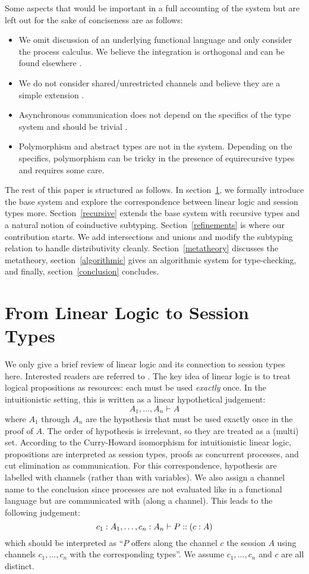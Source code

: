 \documentclass[a4paper,USenglish]{lipics-v2016}
\begin{document}
Some aspects that would be important in a full accounting of the system but are left out for the sake of conciseness are as follows:
\begin{itemize}
  \item We omit discussion of an underlying functional language and only consider the process calculus. We believe the integration is orthogonal and can be found elsewhere \cite{ToninhoCP13}.
  \item We do not consider shared/unrestricted channels and believe they are a simple extension \cite{CairesP10}.
  \item Asynchronous communication does not depend on the specifics of the type system and should be trivial \cite{CairesP10}.
  \item Polymorphism and abstract types are not in the system. Depending on the specifics, polymorphism can be tricky in the presence of equirecursive types and requires some care. 
\end{itemize}

The rest of this paper is structured as follows. In section~\ref{base}, we formally introduce the base system and explore the correspondence between linear logic and session types more. Section~\ref{recursive} extends the base system with recursive types and a natural notion of coinductive subtyping. Section~\ref{refinements} is where our contribution starts. We add intersections and unions and modify the subtyping relation to handle distributivity cleanly. Section~\ref{metatheory} discusses the metatheory, section~\ref{algorithmic} gives an algorithmic system for type-checking, and finally, section~\ref{conclusion} concludes.


\section{From Linear Logic to Session Types}
\label{base}
We only give a brief review of linear logic and its connection to session types here. Interested readers are referred to \cite{CairesP10, PfenningG15, Honda93}. The key idea of linear logic is to treat logical propositions as resources: each must be used \emph{exactly} once. In the intuitionistic setting, this is written as a linear hypothetical judgement:
$$ A_1, \ldots, A_n \vdash A $$
where $A_1$ through $A_n$ are the hypothesis that must be used exactly once in the proof of $A$. The order of hypothesis is irrelevant, so they are treated as a (multi) set. According to the Curry-Howard isomorphism for intuitionistic linear logic, propositions are interpreted as session types, proofs as concurrent processes, and cut elimination as communication. For this correspondence, hypothesis are labelled with channels (rather than with variables). We also assign a channel name to the conclusion since processes are not evaluated like in a functional language but are communicated with (along a channel). This leads to the following judgement:
$$ c_1 : A_1, \ldots, c_n : A_n \vdash P :: (c : A)$$
which should be interpreted as ``$P$ offers along the channel $c$ the session $A$ using channels $c_1, \ldots, c_n$ with the corresponding types''. We assume $c_1, \ldots, c_n$ and $c$ are all distinct.
\end{document}
